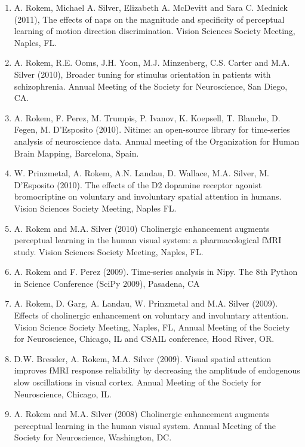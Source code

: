 \documentclass[11pt,fullpage]{article}
\begin{document}
\begin{enumerate}
\item A. Rokem, Michael A. Silver, Elizabeth A. McDevitt and Sara C. Mednick (2011), The effects of naps on the magnitude and specificity of perceptual learning of motion direction discrimination. Vision Sciences Society Meeting, Naples, FL.

\item A. Rokem, R.E. Ooms, J.H. Yoon, M.J. Minzenberg, C.S. Carter and M.A. Silver (2010), Broader tuning for stimulus orientation in patients with schizophrenia. Annual Meeting of the Society for Neuroscience, San Diego, CA.

\item A. Rokem, F. Perez, M. Trumpis, P. Ivanov, K. Koepsell, T. Blanche, D. Fegen, M. D'Esposito (2010). Nitime: an open-source library for time-series analysis of neuroscience data. Annual meeting of the Organization for Human Brain Mapping, Barcelona, Spain.

\item W. Prinzmetal, A. Rokem, A.N. Landau, D. Wallace, M.A. Silver, M. D’Esposito (2010). The effects of the D2 dopamine receptor agonist bromocriptine on voluntary and involuntary spatial attention in humans. Vision Sciences Society Meeting, Naples FL.

\item A. Rokem and M.A. Silver (2010) Cholinergic enhancement augments perceptual learning in the human visual system: a pharmacological fMRI study. Vision Sciences Society Meeting, Naples, FL.

\item A. Rokem and F. Perez (2009). Time-series analysis in Nipy. The 8th Python in Science Conference (SciPy 2009), Pasadena, CA

\item A. Rokem, D. Garg, A. Landau, W. Prinzmetal and M.A. Silver (2009). Effects of cholinergic enhancement on voluntary and involuntary attention. Vision Science Society Meeting, Naples, FL, Annual Meeting of the Society for Neuroscience, Chicago, IL and CSAIL conference, Hood River, OR.

\item D.W. Bressler, A. Rokem, M.A. Silver (2009). Visual spatial attention improves fMRI response reliability by decreasing the amplitude of endogenous slow oscillations in visual cortex. Annual Meeting of the Society for Neuroscience, Chicago, IL.

\item A. Rokem and M.A. Silver (2008) Cholinergic enhancement augments perceptual learning in the human visual system. Annual Meeting of the Society for Neuroscience, Washington, DC.


\end{enumerate}
\end{document}
